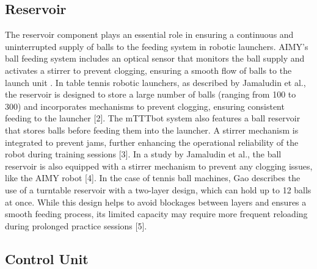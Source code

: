\documentclass[12pt]{report}
\begin{document}
\subsection{Reservoir}

The reservoir component plays an essential role in ensuring a continuous and uninterrupted supply of balls to the feeding system in robotic launchers. AIMY’s ball feeding system includes an optical sensor that monitors the ball supply and activates a stirrer to prevent clogging, ensuring a smooth flow of balls to the launch unit \cite{Dittrich2023}. In table tennis robotic launchers, as described by Jamaludin et al., the reservoir is designed to store a large number of balls (ranging from 100 to 300) and incorporates mechanisms to prevent clogging, ensuring consistent feeding to the launcher [2]. The mTTTbot system also features a ball reservoir that stores balls before feeding them into the launcher. A stirrer mechanism is integrated to prevent jams, further enhancing the operational reliability of the robot during training sessions [3]. In a study by Jamaludin et al., the ball reservoir is also equipped with a stirrer mechanism to prevent any clogging issues, like the AIMY robot [4]. In the case of tennis ball machines, Gao describes the use of a turntable reservoir with a two-layer design, which can hold up to 12 balls at once. While this design helps to avoid blockages between layers and ensures a smooth feeding process, its limited capacity may require more frequent reloading during prolonged practice sessions [5]. 

\subsection{Control Unit}
\end{document}
